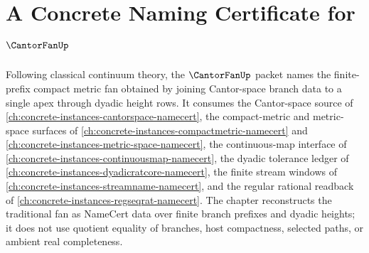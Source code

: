 \chapter{A Concrete Naming Certificate for $\CantorFanUp$}
\label{ch:concrete-instances-cantor-fan-namecert}

Following classical continuum theory, the $\CantorFanUp$ packet names the finite-prefix compact metric fan obtained by joining Cantor-space branch data to a single apex through dyadic height rows. It consumes the Cantor-space source of \autoref{ch:concrete-instances-cantorspace-namecert}, the compact-metric and metric-space surfaces of \autoref{ch:concrete-instances-compactmetric-namecert} and \autoref{ch:concrete-instances-metric-space-namecert}, the continuous-map interface of \autoref{ch:concrete-instances-continuousmap-namecert}, the dyadic tolerance ledger of \autoref{ch:concrete-instances-dyadicratcore-namecert}, the finite stream windows of \autoref{ch:concrete-instances-streamname-namecert}, and the regular rational readback of \autoref{ch:concrete-instances-regseqrat-namecert}. The chapter reconstructs the traditional fan as NameCert data over finite branch prefixes and dyadic heights; it does not use quotient equality of branches, host compactness, selected paths, or ambient real completeness.

